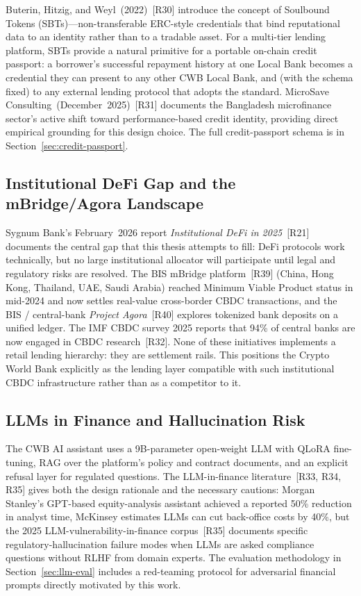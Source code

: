 \documentclass[12pt,a4paper]{report}
\begin{document}
Buterin, Hitzig, and Weyl~(2022)~[R30] introduce the concept of Soulbound Tokens (SBTs)---non-transferable ERC-style credentials that bind reputational data to an identity rather than to a tradable asset. For a multi-tier lending platform, SBTs provide a natural primitive for a portable on-chain credit passport: a borrower's successful repayment history at one Local Bank becomes a credential they can present to any other CWB Local Bank, and (with the schema fixed) to any external lending protocol that adopts the standard. MicroSave Consulting~(December~2025)~[R31] documents the Bangladesh microfinance sector's active shift toward performance-based credit identity, providing direct empirical grounding for this design choice. The full credit-passport schema is in Section~\ref{sec:credit-passport}.

\subsection{Institutional DeFi Gap and the mBridge/Agora Landscape}
\label{sec:lit-institutional}

Sygnum Bank's February~2026 report \textit{Institutional DeFi in 2025}~[R21] documents the central gap that this thesis attempts to fill: DeFi protocols work technically, but no large institutional allocator will participate until legal and regulatory risks are resolved. The BIS mBridge platform~[R39] (China, Hong Kong, Thailand, UAE, Saudi Arabia) reached Minimum Viable Product status in mid-2024 and now settles real-value cross-border CBDC transactions, and the BIS / central-bank \textit{Project Agora}~[R40] explores tokenized bank deposits on a unified ledger. The IMF CBDC survey 2025 reports that 94\% of central banks are now engaged in CBDC research~[R32]. None of these initiatives implements a retail lending hierarchy: they are settlement rails. This positions the Crypto World Bank explicitly as the lending layer compatible with such institutional CBDC infrastructure rather than as a competitor to it.

\subsection{LLMs in Finance and Hallucination Risk}
\label{sec:lit-llm}

The CWB AI assistant uses a 9B-parameter open-weight LLM with QLoRA fine-tuning, RAG over the platform's policy and contract documents, and an explicit refusal layer for regulated questions. The LLM-in-finance literature~[R33, R34, R35] gives both the design rationale and the necessary cautions: Morgan Stanley's GPT-based equity-analysis assistant achieved a reported 50\% reduction in analyst time, McKinsey estimates LLMs can cut back-office costs by 40\%, but the 2025 LLM-vulnerability-in-finance corpus~[R35] documents specific regulatory-hallucination failure modes when LLMs are asked compliance questions without RLHF from domain experts. The evaluation methodology in Section~\ref{sec:llm-eval} includes a red-teaming protocol for adversarial financial prompts directly motivated by this work.
\end{document}
